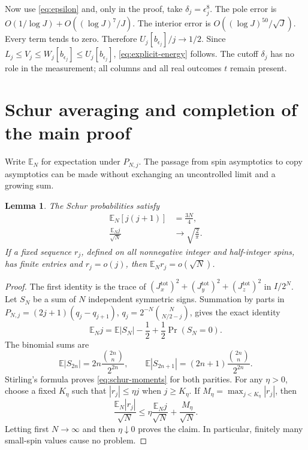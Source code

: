 \documentclass[aps,pra,reprint,superscriptaddress]{revtex4-2}
\newtheorem{lemma}[theorem]{Lemma}
\theoremstyle{remark}
\newcommand{\E}{\mathbb E}
\begin{document}
Now use \eqref{eq:epsilon} and, only in the proof, take
$\delta_j=\epsilon_j^8$. The pole error is
$O(1/\log J)+O((\log J)^7/J)$. The interior error is
$O((\log J)^{50}/\sqrt J)$.
Every term tends to zero. Therefore
$U_j[b_{\epsilon_j}]/j\to1/2$.
Since $L_j\leq V_j\leq W_j[b_{\epsilon_j}]\leq
U_j[b_{\epsilon_j}]$, \eqref{eq:explicit-energy} follows.
The cutoff $\delta_j$ has no role in the measurement; all columns
and all real outcomes $t$ remain present.


\section{Schur averaging and completion of the main proof}\label{sec:averaging}
Write $\E_N$ for expectation under $P_{N,j}$.
The passage from spin asymptotics to copy asymptotics can be made
without exchanging an uncontrolled limit and a growing sum.

\begin{lemma}\label{lem:averaging}
The Schur probabilities satisfy
\begin{equation}
\begin{aligned}
\E_N[j(j+1)]&=\frac{3N}{4},\\
\frac{\E_Nj}{\sqrt N}&\longrightarrow\sqrt{\frac2\pi}.
\end{aligned}
\label{eq:schur-moments}
\end{equation}
If a fixed sequence $r_j$, defined on all nonnegative integer and
half-integer spins, has finite entries and $r_j=o(j)$, then
$\E_Nr_j=o(\sqrt N)$.
\end{lemma}
\begin{proof}
The first identity is the trace of
$(J_x^{\mathrm{tot}})^2+(J_y^{\mathrm{tot}})^2+
(J_z^{\mathrm{tot}})^2$ in $I/2^N$.
Let $S_N$ be a sum of $N$ independent symmetric signs. Summation
by parts in
$P_{N,j}=(2j+1)(q_j-q_{j+1})$,
$q_j=2^{-N}\binom N{N/2-j}$, gives the exact identity
\begin{equation}
 \E_Nj=\E|S_N|-\frac12+\frac12\Pr(S_N=0).
 \label{eq:walk}
\end{equation}
The binomial sums are
\[
 \E|S_{2n}|=2n\frac{\binom{2n}n}{2^{2n}},\qquad
 \E|S_{2n+1}|=(2n+1)\frac{\binom{2n}n}{2^{2n}}.
\]
Stirling's formula proves \eqref{eq:schur-moments} for both parities.
For any $\eta>0$, choose a fixed $K_\eta$ such that
$|r_j|\leq\eta j$ when $j\geq K_\eta$. If
$M_\eta=\max_{j<K_\eta}|r_j|$, then
\[
 \frac{\E_N|r_j|}{\sqrt N}
 \leq\eta\frac{\E_Nj}{\sqrt N}+\frac{M_\eta}{\sqrt N}.
\]
Letting first $N\to\infty$ and then $\eta\downarrow0$ proves the
claim. In particular, finitely many small-spin values cause no
problem.
\end{proof}
\end{document}

